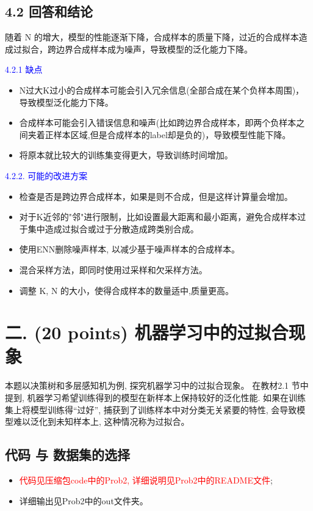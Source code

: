 \documentclass[8pt]{article}
\begin{document}
\subsection*{4.2 回答和结论}
随着 N 的增大，模型的性能逐渐下降，合成样本的质量下降，过近的合成样本造成过拟合，跨边界合成样本成为噪声，导致模型的泛化能力下降。

\textcolor{blue}{4.2.1 缺点}
    \begin{itemize}
        \item N过大K过小的合成样本可能会引入冗余信息(全部合成在某个负样本周围)，导致模型泛化能力下降。
        \item 合成样本可能会引入错误信息和噪声(比如跨边界合成样本，即两个负样本之间夹着正样本区域,但是合成样本的label却是负的)，导致模型性能下降。
        \item 将原本就比较大的训练集变得更大，导致训练时间增加。
    \end{itemize}

\textcolor{blue}{4.2.2. 可能的改进方案}
    \begin{itemize}
        \item 检查是否是跨边界合成样本，如果是则不合成，但是这样计算量会增加。
        \item 对于K近邻的"邻"进行限制，比如设置最大距离和最小距离，避免合成样本过于集中造成过拟合或过于分散造成跨类别合成。
        \item 使用ENN删除噪声样本, 以减少基于噪声样本的合成样本。
        \item 混合采样方法，即同时使用过采样和欠采样方法。
        \item 调整 K, N 的大小，使得合成样本的数量适中,质量更高。
    \end{itemize}

\vspace{3em}

\section*{二. (20 points) 机器学习中的过拟合现象}

本题以决策树和多层感知机为例, 探究机器学习中的过拟合现象。 在教材2.1 节中提到, 机器学习希望训练得到的模型在新样本上保持较好的泛化性能. 如果在训练集上将模型训练得“过好”, 捕获到了训练样本中对分类无关紧要的特性, 会导致模型难以泛化到未知样本上, 这种情况称为过拟合。

\subsection*{代码 与 数据集的选择}
\begin{itemize}
    \item \textcolor{red}{代码见压缩包code中的Prob2, 详细说明见Prob2中的README文件}; 
    \item 详细输出见Prob2中的out文件夹。
\end{itemize}
\end{document}
